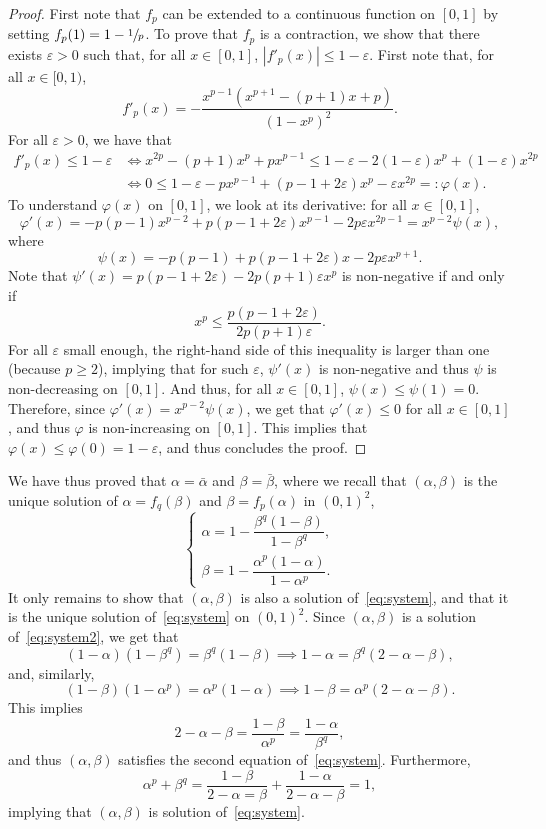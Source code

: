 \documentclass[JEP,XML,SOM,Unicode,NoFloatCountersInSection,published]{cedram}
\let \nicefrac\sfrac
\numberwithin{equation}{section}
\theoremstyle{definition}
\begin{document}
\begin{proof}
First note that $f_p$ can be extended to a continuous function on $[0,1]$ by setting $f_p(1) = 1-\nicefrac1p$. To prove that $f_p$ is a contraction, we show that there exists $\varepsilon>0$ such that, for all $x\in[0,1]$, $|f'_p(x)|\leq 1-\varepsilon$.
First note that, for all $x\in [0,1)$,
\[
f'_p(x) = -\frac{x^{p-1}(x^{p+1}-(p+1)x+{p})}{(1-x^p)^2}.
\]
For all $\varepsilon>0$, we have that
\begin{align*}
f'_p(x)\leq 1-\varepsilon
&\iff x^{2p}-(p+1)x^p +px^{p-1}
\leq 1-\varepsilon -2(1-\varepsilon)x^p+(1-\varepsilon) x^{2p}\\
&\iff 0\leq 1-\varepsilon - px^{p-1} + (p-1+2\varepsilon)x^p-\varepsilon x^{2p}
=:\varphi(x).
\end{align*}
To understand $\varphi(x)$ on $[0,1]$, we look at its derivative: for all $x\in [0,1]$,
\[
\varphi'(x)
= -p(p-1)x^{p-2}+p(p-1+2\varepsilon)x^{p-1}-2p\varepsilon x^{2p-1} = x^{p-2}\psi(x),
\]
where
\[
\psi(x) = -p(p-1)+p(p-1+2\varepsilon)x-2p\varepsilon x^{p+1}.
\]
Note that $\psi'(x) = p(p-1+2\varepsilon)-2p(p+1)\varepsilon x^p$ is non-negative if and only if
\[
x^p\leq \frac{p(p-1+2\varepsilon)}{2p(p+1)\varepsilon}.
\]
For all $\varepsilon$ small enough, the right-hand side of this inequality is larger than one (because $p\geq 2$), implying that for such $\varepsilon$, $\psi'(x)$ is non-negative and thus $\psi$ is non-decreasing on $[0,1]$.
And thus, for all $x\in [0,1]$, $\psi(x)\leq \psi(1) = 0$.
Therefore, since $\varphi'(x) = x^{p-2}\psi(x)$, we get that $\varphi'(x)\leq 0$ for all $x\in [0,1]$,
and thus $\varphi$ is non-increasing on $[0,1]$. This implies that
$\varphi(x)\leq \varphi(0) = 1-\varepsilon$, and thus concludes the proof.
\end{proof}

We have thus proved that $\alpha = \bar\alpha$ and $\beta = \bar\beta$,
where we recall that $(\alpha, \beta)$ is the unique solution of $\alpha = f_q(\beta)$ and $\beta = f_p(\alpha)$ in $(0,1)^2$, \ie
\begin{equation}\label{eq:system2}
\begin{cases}
\alpha = 1-\dfrac{\beta^q(1-\beta)}{1-\beta^q},\\[5pt]
\beta = 1-\dfrac{\alpha^p(1-\alpha)}{1-\alpha^p}.
\end{cases}
\end{equation}
It only remains to show that $(\alpha,\beta)$ is also {a} solution of~\eqref{eq:system},
and that it is the unique solution of~\eqref{eq:system} on $(0,1)^2$.
Since $(\alpha,\beta)$ is {a} solution of~\eqref{eq:system2}, we get that
\[
(1-\alpha)(1-\beta^q) =\beta^q(1-\beta)
\implies 1-\alpha=\beta^q(2-\alpha-\beta),
\]
and, similarly,
\[
(1-\beta)(1-\alpha^p) =\alpha^p(1-\alpha)
\implies 1-\beta=\alpha^p(2-\alpha-\beta).
\]
This implies
\[
2-\alpha-\beta = \frac{1-\beta}{\alpha^p} = \frac{1-\alpha}{\beta^q},
\]
and thus $(\alpha,\beta)$ satisfies the second equation of~\eqref{eq:system}.
Furthermore,
\[
\alpha^p+\beta^q = \frac{1-\beta}{2-\alpha=\beta} + \frac{1-\alpha}{2-\alpha-\beta} = 1,
\]
implying that $(\alpha,\beta)$ is solution of~\eqref{eq:system}.
\end{document}

